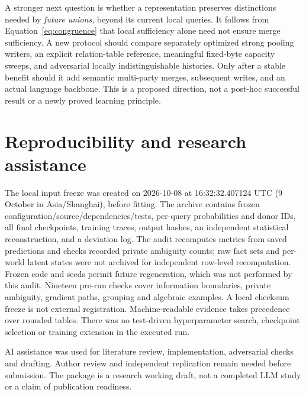 \documentclass[10pt]{article}
\begin{document}
A stronger next question is whether a representation preserves distinctions
needed by \emph{future unions}, beyond its current local queries. It follows
from Equation~\ref{eq:congruence} that local sufficiency alone need not ensure
merge sufficiency. A new protocol should compare separately optimized strong
pooling writers, an explicit relation-table reference, meaningful fixed-byte
capacity sweeps, and adversarial locally indistinguishable histories. Only
after a stable benefit should it add semantic multi-party merges, subsequent
writes, and an actual language backbone. This is a proposed direction, not a
post-hoc successful result or a newly proved learning principle.

\section*{Reproducibility and research assistance}
The local input freeze was created on 2026-10-08 at
16:32:32.407124 UTC (9 October in Asia/Shanghai), before fitting.
The archive contains frozen configuration/source/dependencies/tests,
per-query probabilities and donor IDs, all final checkpoints, training traces,
output hashes, an independent statistical reconstruction, and a deviation log.
The audit recomputes metrics from saved predictions and checks recorded private
ambiguity counts; raw fact sets and per-world latent states were not archived
for independent row-level recomputation. Frozen code and seeds permit future
regeneration, which was not performed by this audit.
Nineteen pre-run checks cover information boundaries, private ambiguity,
gradient paths, grouping and algebraic examples. A local checksum freeze is
not external registration. Machine-readable evidence takes precedence over
rounded tables. There was no test-driven hyperparameter search, checkpoint
selection or training extension in the executed run.

AI assistance was used for literature review, implementation, adversarial
checks and drafting. Author review and independent replication remain needed
before submission. The package is a research working draft, not a completed
LLM study or a claim of publication readiness.
\end{document}
